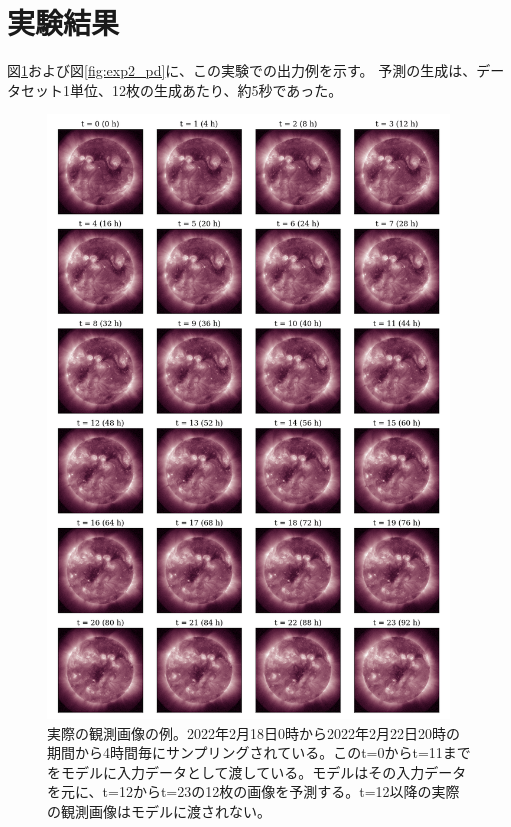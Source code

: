   \section{実験結果}
    図\ref{fig:exp2_gt}および図\ref{fig:exp2_pd}に、この実験での出力例を示す。
    予測の生成は、データセット1単位、12枚の生成あたり、約5秒であった。
    \begin{figure}[htbp]
      \centering
      \includegraphics[width=0.95\textwidth]{figures/exp2/gt.png}
      \caption{実際の観測画像の例。2022年2月18日0時から2022年2月22日20時の期間から4時間毎にサンプリングされている。このt=0からt=11までをモデルに入力データとして渡している。モデルはその入力データを元に、t=12からt=23の12枚の画像を予測する。t=12以降の実際の観測画像はモデルに渡されない。}
      \label{fig:exp2_gt}
    \end{figure}
